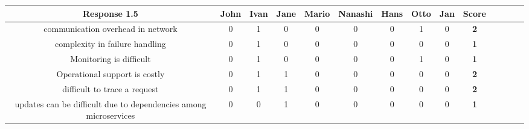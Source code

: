 \begin{table}[H]
\centering
\begin{adjustbox}{max width=\textwidth}
\begin{tabular}{*{14}{|c}|}%
\hline
\textbf{Response 1.5}   & John & Ivan & Jane & Mario & Nanashi & Hans & Otto & Jan & \textbf{Score}\\
 \hline
communication overhead in network               & 0 & 1 & 0 & 0 & 0 & 0 & 1 & 0 & \textbf{2}    \\ 
 \hline
complexity in failure handling  & 0 & 1 & 0 & 0 & 0 & 0 & 0 & 0 & \textbf{1} \\ 
 \hline
Monitoring is difficult           & 0 & 1 & 0 & 0 & 0 & 0 & 1 & 0 & \textbf{1} \\ 
 \hline
 Operational support is costly           & 0 & 1 & 1 & 0 & 0 & 0 & 0 & 0 & \textbf{2} \\ 
 \hline
 difficult to trace a request           & 0 & 1 & 1 & 0 & 0 & 0 & 0 & 0 & \textbf{2} \\ 
 \hline
 updates can be difficult due to dependencies among microservices          & 0 & 0 & 1 & 0 & 0 & 0 & 0 & 0 & \textbf{1} \\ 
 \hline
 \hline
\end{tabular}
\end{adjustbox}
\label{tab:hybris_architecture/interview/question_1.5}
\end{table}
\\


